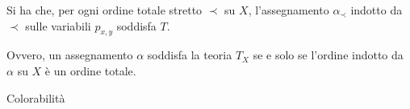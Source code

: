 \documentclass[a4paper,11pt]{report}
\begin{document}
        Si ha che, per ogni ordine totale stretto \( \prec \) su \(X \), l'assegnamento \( \alpha_\prec \) indotto da \( \prec \) sulle variabili \( p_{x, y} \) soddisfa \( T \).

        Ovvero, un assegnamento \( \alpha \) soddisfa la teoria \( T_X \) se e solo se l'ordine indotto da \( \alpha \) su \( X \) è un ordine totale.

        \begin{gbox}{Colorabilità}
            
        \end{gbox}





        
\end{document}
